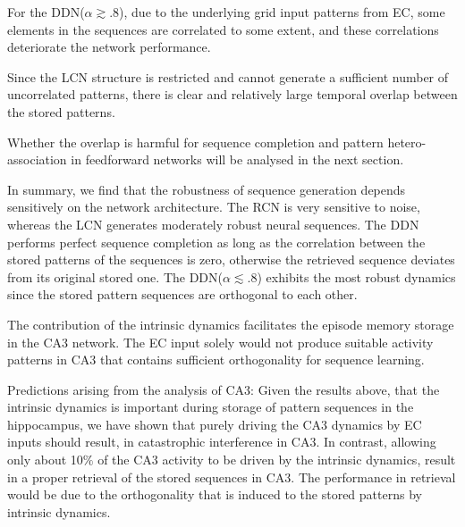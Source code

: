 \documentclass[utf8]{frontiersSCNS} %
\begin{document}
%
For the DDN($\alpha \gtrsim .8$), due to the underlying grid input patterns from EC, some elements in the sequences are correlated to some extent, and these correlations deteriorate the network performance.


Since the LCN structure is restricted and cannot generate a sufficient number of uncorrelated patterns, there is clear and relatively large temporal overlap between the stored patterns. 

Whether the overlap is harmful for sequence completion and pattern hetero-association in feedforward networks will be analysed in the next section. 

In summary, we find that the robustness of sequence generation depends sensitively on the network architecture. The RCN is very sensitive to noise, whereas the LCN generates moderately robust neural sequences. The DDN performs perfect sequence completion as long as the correlation between the stored patterns of the sequences is zero, otherwise the retrieved sequence deviates from its original stored one. The DDN($\alpha \lesssim .8$) exhibits the most robust dynamics since the stored pattern sequences are orthogonal to each other.

The contribution of the intrinsic dynamics facilitates the episode memory storage in the CA3 network. The EC input solely would not produce suitable activity patterns in CA3 that contains sufficient orthogonality for sequence learning.


Predictions arising from the analysis of CA3: Given the results above, that the intrinsic dynamics is important during storage of pattern sequences in the hippocampus, we have shown that purely driving the CA3 dynamics by EC inputs should result, in catastrophic interference in CA3. In contrast, allowing only about 10$\%$ of the CA3 activity to be driven by the intrinsic dynamics, result in a proper retrieval of the stored sequences in CA3. The performance in retrieval would be due to the orthogonality that is induced to the stored patterns by intrinsic dynamics. 
\end{document}
